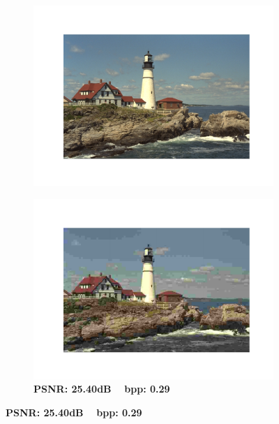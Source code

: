 \begin{figure}[t]
	\centering
	\begin{subfigure}{.23\textwidth}
		\centering
		\includegraphics[trim=1.7cm 1.5cm 1.7cm 1.7cm, clip, width=1\textwidth]{figures/kodim21_original.pdf}
		\vspace{-20pt}
		\caption*{}
	\end{subfigure}%
	\begin{subfigure}{.23\textwidth}
		\centering
		\includegraphics[trim=1.7cm 1.5cm 1.7cm 1.7cm, clip, width=1\textwidth]{figures/kodim21_JPEG_bpp_0.293.pdf}
		\vspace{-20pt}
		\caption*{\tiny \textbf{PSNR: 25.40dB ~ bpp: 0.29}}

\end{subfigure}
\end{figure}
